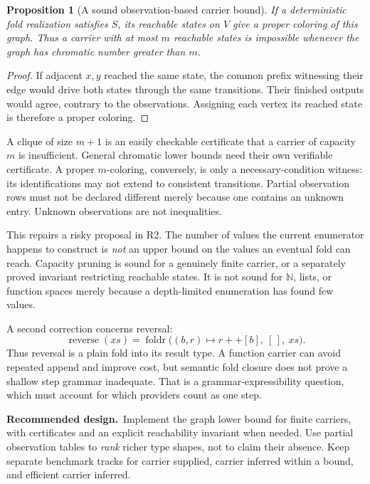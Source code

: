 \documentclass[11pt,a4paper]{article}
\newcommand{\proposal}{\noindent\textbf{Recommended design.}\ }
\newcommand{\N}{\mathbb{N}}
\newcommand{\fold}{\operatorname{foldr}}
\newtheorem{proposition}{Proposition}[section]
\theoremstyle{remark}
\begin{document}
\begin{proposition}[A sound observation-based carrier bound]\label{prop:carrier}
If a deterministic fold realization satisfies $S$, its reachable states on $V$ give a proper coloring of this graph. Thus a carrier with at most $m$ reachable states is impossible whenever the graph has chromatic number greater than $m$.
\end{proposition}
\begin{proof}
If adjacent $x,y$ reached the same state, the common prefix witnessing their edge would drive both states through the same transitions. Their finished outputs would agree, contrary to the observations. Assigning each vertex its reached state is therefore a proper coloring.
\end{proof}

A clique of size $m+1$ is an easily checkable certificate that a carrier of capacity $m$ is insufficient. General chromatic lower bounds need their own verifiable certificate. A proper $m$-coloring, conversely, is only a necessary-condition witness: its identifications may not extend to consistent transitions. Partial observation rows must not be declared different merely because one contains an unknown entry. Unknown observations are not inequalities.

This repairs a risky proposal in R2. The number of values the current enumerator happens to construct is \emph{not} an upper bound on the values an eventual fold can reach. Capacity pruning is sound for a genuinely finite carrier, or a separately proved invariant restricting reachable states. It is not sound for $\N$, lists, or function spaces merely because a depth-limited enumeration has found few values.

A second correction concerns reversal:
\[
 \operatorname{reverse}(xs)
   =\fold\bigl((b,r)\mapsto r++[b],\ [\,],\ xs\bigr).
\]
Thus reversal is a plain fold into its result type. A function carrier can avoid repeated append and improve cost, but semantic fold closure does not prove a shallow step grammar inadequate. That is a grammar-expressibility question, which must account for which providers count as one step.

\proposal Implement the graph lower bound for finite carriers, with certificates and an explicit reachability invariant when needed. Use partial observation tables to \emph{rank} richer type shapes, not to claim their absence. Keep separate benchmark tracks for carrier supplied, carrier inferred within a bound, and efficient carrier inferred.
\end{document}
